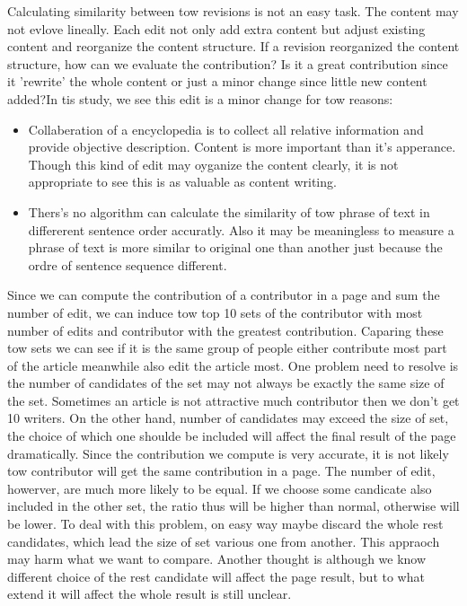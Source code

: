 \documentclass{elsarticle}
\begin{document}
Calculating similarity between tow revisions is not an easy task. The
content may not evlove lineally. Each edit not only add extra content
but adjust existing content and reorganize the content
structure. If a revision reorganized the content structure, how can we
evaluate  the contribution? Is it a great contribution since it
'rewrite' the whole content or just a minor change since little new
content added?In tis study, we see this edit is a minor change for tow
reasons:
\begin{itemize}
\item Collaberation of a encyclopedia is to collect all relative
  information and provide objective description. Content is more
  important than it's apperance. Though this kind of edit may oyganize
  the content clearly, it is not appropriate to see this is as
  valuable as content writing.
\item Thers's no algorithm can calculate the similarity of tow phrase
  of text in differerent sentence order accuratly. Also it may be
  meaningless to measure a phrase of text is more similar to original
  one than another just because the ordre of sentence sequence different. 
\end{itemize}

Since we can compute the contribution of a contributor in a page and
sum the number of edit, we can induce tow top 10 sets of
the contributor with most number of edits and contributor with the
greatest contribution. Caparing these tow sets we can see if it is the
same group of people either contribute most part of the article
meanwhile also edit the article most.   One problem need to resolve is
the number of candidates of  the set may not always    be exactly
the same size of the
set. Sometimes an article is not attractive much contributor then we
don't get 10 writers. On the other hand, number of candidates may
exceed the size of set, the choice of which one shoulde be included
will affect the final result of the page dramatically. Since the
contribution we compute is very accurate, it is not likely tow
contributor will get the same contribution in a page. The number of
edit, howerver, are much more likely to be equal. If we choose some
candicate also included in the other set, the ratio thus will be
higher than normal, otherwise will be lower. To deal with this
problem, on easy way maybe discard  the whole rest candidates, which
lead the size of set various one from another. This appraoch may harm
what we want to compare. Another thought is although we know different
choice of the rest candidate will affect the  page result, but to what
extend it will affect the whole result is still unclear. 
  
\end{document}
